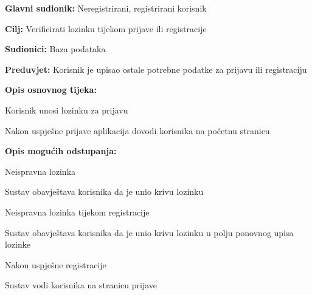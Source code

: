 				\noindent {}
					\begin{packed_item}
	
						\item \textbf{Glavni sudionik: }Neregistrirani, registrirani korisnik
						\item  \textbf{Cilj:} Verificirati lozinku tijekom prijave ili registracije
						\item  \textbf{Sudionici:} Baza podataka
						\item  \textbf{Preduvjet:} Korisnik je upisao ostale potrebne podatke za prijavu ili registraciju
						\item  \textbf{Opis osnovnog tijeka:}
						
						\item[] \begin{packed_enum}
	
							\item Korisnik unosi lozinku za prijavu
							\item Nakon uspješne prijave aplikacija dovodi korisnika na početnu stranicu
							
						\end{packed_enum}
						
						\item  \textbf{Opis mogućih odstupanja:}
						
						\item[] \begin{packed_item}
	
							\item[1.a] Neispravna lozinka	
								\begin{packed_item}
									\item Sustav obavještava korisnika da je unio krivu lozinku
								\end{packed_item}
								
							\item[1.b] Neispravna lozinka tijekom registracije
								\begin{packed_item}
									\item Sustav obavještava korisnika da je unio krivu lozinku u polju ponovnog upisa lozinke
								\end{packed_item}
								
							\item[2.a] Nakon uspješne registracije
								\begin{packed_item}
									\item Sustav vodi korisnika na stranicu prijave
								\end{packed_item}
							
						\end{packed_item}				
					\end{packed_item}
					
